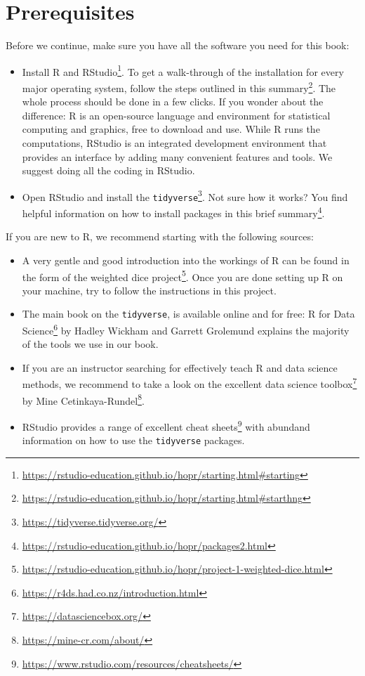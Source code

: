 \documentclass[
]{book}
\providecommand{\tightlist}{%
  \setlength{\itemsep}{0pt}\setlength{\parskip}{0pt}}
\renewcommand{\href}[2]{#2\footnote{\url{#1}}}
\begin{document}
\hypertarget{prerequisites}{%
\section*{Prerequisites}\label{prerequisites}}


Before we continue, make sure you have all the software you need for this book:

\begin{itemize}
\tightlist
\item
  \href{https://rstudio-education.github.io/hopr/starting.html\#starting}{Install R and RStudio}. To get a walk-through of the installation for every major operating system, follow the steps outlined \href{https://rstudio-education.github.io/hopr/starting.html\#starthng}{in this summary}. The whole process should be done in a few clicks. If you wonder about the difference: R is an open-source language and environment for statistical computing and graphics, free to download and use. While R runs the computations, RStudio is an integrated development environment that provides an interface by adding many convenient features and tools. We suggest doing all the coding in RStudio.
\item
  Open RStudio and \href{https://tidyverse.tidyverse.org/}{install the \texttt{tidyverse}}. Not sure how it works? You find helpful information on how to install packages in this \href{https://rstudio-education.github.io/hopr/packages2.html}{brief summary}.
\end{itemize}

If you are new to R, we recommend starting with the following sources:

\begin{itemize}
\tightlist
\item
  A very gentle and good introduction into the workings of R can be found in the form of the \href{https://rstudio-education.github.io/hopr/project-1-weighted-dice.html}{weighted dice project}. Once you are done setting up R on your machine, try to follow the instructions in this project.
\item
  The main book on the \texttt{tidyverse}, \citet{Wickham2016} is available online and for free: \href{https://r4ds.had.co.nz/introduction.html}{R for Data Science} by Hadley Wickham and Garrett Grolemund explains the majority of the tools we use in our book.
\item
  If you are an instructor searching for effectively teach R and data science methods, we recommend to take a look on the excellent \href{https://datasciencebox.org/}{data science toolbox} by \href{https://mine-cr.com/about/}{Mine Cetinkaya-Rundel}.
\item
  RStudio provides a range of excellent \href{https://www.rstudio.com/resources/cheatsheets/}{cheat sheets} with abundand information on how to use the \texttt{tidyverse} packages.
\end{itemize}
\end{document}
